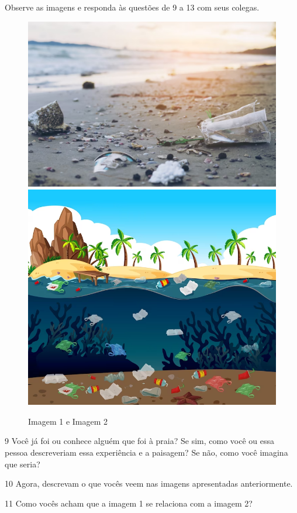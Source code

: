 \pagebreak
Observe as imagens e responda às questões de 9 a 13 com seus colegas.

\begin{figure}[htpb!]
\includegraphics[width=.5\textwidth]{./imgs/img35.png}
\includegraphics[width=.38\textwidth]{./imgs/img36.png}
\caption{Imagem 1 e Imagem 2}
\end{figure}



\num{9} Você já foi ou conhece alguém que foi à praia? Se sim, como você ou essa
pessoa descreveriam essa experiência e a paisagem? Se não, como você
imagina que seria?


\num{10} Agora, descrevam o que vocês veem nas imagens apresentadas anteriormente.


\num{11} Como vocês acham que a imagem 1 se relaciona com a imagem 2?

